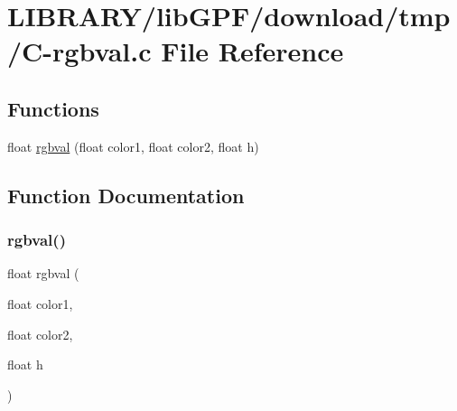 \hypertarget{C-rgbval_8c}{}\section{L\+I\+B\+R\+A\+R\+Y/lib\+G\+P\+F/download/tmp/\+C-\/rgbval.c File Reference}
\label{C-rgbval_8c}
\subsection*{Functions}
\begin{DoxyCompactItemize}
\item 
float \hyperlink{C-rgbval_8c_a44944ef0b70e4ce364fa785ff6750eac}{rgbval} (float color1, float color2, float h)
\end{DoxyCompactItemize}


\subsection{Function Documentation}
\mbox{\label{C-rgbval_8c_a44944ef0b70e4ce364fa785ff6750eac}} 
\subsubsection{\texorpdfstring{rgbval()}{rgbval()}}
{\footnotesize\ttfamily float rgbval (\begin{DoxyParamCaption}\item[{float}]{color1,  }\item[{float}]{color2,  }\item[{float}]{h }\end{DoxyParamCaption})}

